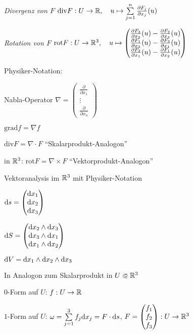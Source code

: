 \documentclass{cheat-sheet}
\begin{document}
\emph{Divergenz von $F$}
$\mathrm{div} F : U \to \R, \quad u \mapsto \sum_{j=1}^n \frac{\partial F_j}{\partial x_j} (u)$

\emph{Rotation von $F$}
$\mathrm{rot} F : U \to \mathbb{R}^3, \quad u \mapsto \begin{pmatrix}
  \frac{\partial F_3}{\partial x_2} (u) - \frac{\partial F_2}{\partial x_3} (u) \\
  \frac{\partial F_1}{\partial x_3} (u) - \frac{\partial F_3}{\partial x_1} (u) \\
  \frac{\partial F_2}{\partial x_1} (u) - \frac{\partial F_1}{\partial x_2} (u)
\end{pmatrix}$

Physiker-Notation:

Nabla-Operator $\nabla = \begin{pmatrix} \frac{\partial}{\partial x_1} \\ \vdots \\ \frac{\partial}{\partial x_n} \end{pmatrix}$ %

$\mathrm{grad} f = \nabla f$ %

$\mathrm{div} F = \nabla \cdot F$ %
"`Skalarprodukt-Analogon"'
 
in $\mathbb{R}^3$: $\mathrm{rot} F = \nabla \times F$ %
"`Vektorprodukt-Analogon"'

Vektoranalysis im $\mathbb{R}^3$ mit Physiker-Notation

$\mathrm{d} s = \begin{pmatrix} \mathrm{d} x_1 \\ \mathrm{d} x_2 \\ \mathrm{d} x_3 \end{pmatrix}$ %

$\mathrm{d} S = \begin{pmatrix} \mathrm{d} x_2 \wedge \mathrm{d} x_3 \\ \mathrm{d} x_3 \wedge \mathrm{d} x_1 \\ \mathrm{d} x_1 \wedge \mathrm{d} x_2 \end{pmatrix}$ %

$\mathrm{d} V = \mathrm{d} x_1 \wedge \mathrm{d} x_2 \wedge \mathrm{d} x_3$

In Analogon zum Skalarprodukt in $U \opn \R^3$

$0$-Form auf $U$: $f : U \to \mathbb{R}$

$1$-Form auf $U$: $\omega = \sum_{j=1}^3 f_j \d x_j = F \cdot \d s$, $F = \begin{pmatrix} f_1 \\ f_2 \\ f_3 \end{pmatrix} : U \to \mathbb{R}^3$
\end{document}
